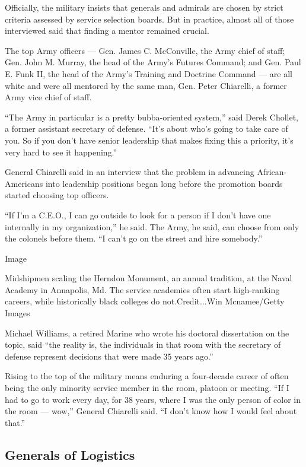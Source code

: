 Officially, the military insists that generals and admirals are chosen
by strict criteria assessed by service selection boards. But in
practice, almost all of those interviewed said that finding a mentor
remained crucial.

The top Army officers --- Gen. James C. McConville, the Army chief of
staff; Gen. John M. Murray, the head of the Army's Futures Command; and
Gen. Paul E. Funk II, the head of the Army's Training and Doctrine
Command --- are all white and were all mentored by the same man, Gen.
Peter Chiarelli, a former Army vice chief of staff.

``The Army in particular is a pretty bubba-oriented system,'' said Derek
Chollet, a former assistant secretary of defense. ``It's about who's
going to take care of you. So if you don't have senior leadership that
makes fixing this a priority, it's very hard to see it happening.''

General Chiarelli said in an interview that the problem in advancing
African-Americans into leadership positions began long before the
promotion boards started choosing top officers.

``If I'm a C.E.O., I can go outside to look for a person if I don't have
one internally in my organization,'' he said. The Army, he said, can
choose from only the colonels before them. ``I can't go on the street
and hire somebody.''

Image

Midshipmen scaling the Herndon Monument, an annual tradition, at the
Naval Academy in Annapolis, Md. The service academies often start
high-ranking careers, while historically black colleges do
not.Credit...Win Mcnamee/Getty Images

Michael Williams, a retired Marine who wrote his doctoral dissertation
on the topic, said ``the reality is, the individuals in that room with
the secretary of defense represent decisions that were made 35 years
ago.''

Rising to the top of the military means enduring a four-decade career of
often being the only minority service member in the room, platoon or
meeting. ``If I had to go to work every day, for 38 years, where I was
the only person of color in the room --- wow,'' General Chiarelli said.
``I don't know how I would feel about that.''

\hypertarget{generals-of-logistics}{%
\subsection{Generals of Logistics}\label{generals-of-logistics}}

